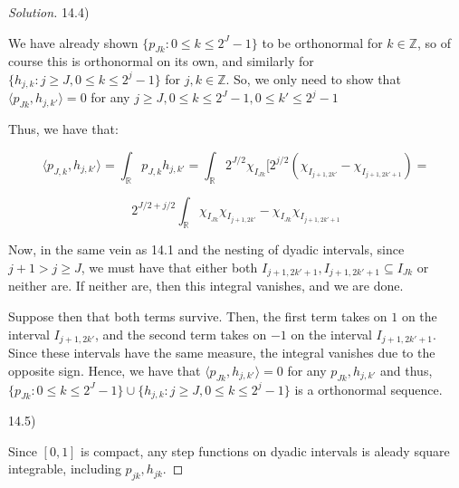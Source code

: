 \documentclass[10pt]{article}
\begin{document}
\begin{proof}[Solution]
14.4)

We have already shown $\{ p_{Jk} : 0 \leq k \leq 2^J - 1 \}$ to be orthonormal for $k \in \mathbb{Z}$, so of course this is orthonormal on its own, and similarly for $\{ h_{j,k} : j \geq J, 0 \leq k \leq 2^j - 1 \}$ for $j,k \in \mathbb{Z}$. So, we only need to show that $\langle p_{Jk}, h_{j, k'} \rangle = 0$ for any $j \geq J, 0 \leq k \leq 2^J - 1, 0 \leq k' \leq 2^j - 1 $

Thus, we have that:

$$\langle  p_{J,k}, h_{j, k'} \rangle = \int_{\mathbb{R}}p_{J,k} h_{j, k'} = \int_{\mathbb{R}} 2^{J/2} \chi_{I_{Jk}}[ 2^{j/2} (\chi_{I_{j+1, 2k'}} - \chi_{I_{j+1, 2k'+1}} ) = $$

$$ 2^{J/2 + j/2} \int_{\mathbb{R}}  \chi_{I_{Jk}} \chi_{I_{j+1, 2k'}} -  \chi_{I_{Jk}} \chi_{I_{j+1, 2k' + 1}} $$

Now, in the same vein as 14.1 and the nesting of dyadic intervals, since $j+1 > j \geq J$, we must have that either both $I_{j+1, 2k' + 1}, I_{j+1, 2k' + 1} \subseteq I_{Jk}$ or neither are. If neither are, then this integral vanishes, and we are done.

Suppose then that both terms survive. Then, the first term takes on $1$ on the interval $ I_{j+1, 2k'}$, and the second term takes on $-1$ on the interval $I_{j+1, 2k' + 1}$. Since these intervals have the same measure, the integral vanishes due to the opposite sign. Hence, we have that $\langle p_{Jk}, h_{j, k'} \rangle = 0$ for any $p_{Jk}, h_{j, k'}$ and thus, $\{ p_{Jk} : 0 \leq k \leq 2^J - 1 \} \cup \{ h_{j,k} : j \geq J, 0 \leq k \leq 2^j - 1 \}$ is a orthonormal sequence.

14.5)

Since $[0,1]$ is compact, any step functions on dyadic intervals is aleady square integrable, including $p_{jk}, h_{jk}$. 




\end{proof}
\end{document}
